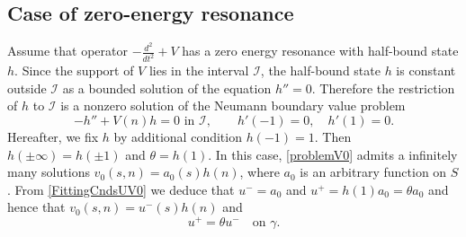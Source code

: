 \documentclass[reqno]{amsart}
\theoremstyle{plain}
\numberwithin{equation}{section}
\newcommand{\cI}{\mathcal{I}}
\begin{document}
\subsection{Case of zero-energy resonance}
Assume that operator $-\frac{d^2}{dt^2}+V$ has a zero energy resonance with half-bound state $h$. Since the support of $V$ lies in  the interval $\cI$, the half-bound state $h$ is  constant  outside $\cI$ as a bounded solution of the equation $h''=0$.
Therefore the restriction of $h$ to $\cI$ is a nonzero solution of the Neumann boundary value problem
\begin{equation}\label{NeumanProblem}
     -h''+V(n)h=0 \text{ \ in }\cI,\qquad   h'(-1)=0, \quad h'(1)=0.
\end{equation}
Hereafter, we fix $h$ by additional condition $h(-1)=1$. Then $h(\pm\infty)=h(\pm 1)$ and $\theta=h(1)$.
In this case, \eqref{problemV0}  admits a infinitely many solutions $v_0(s,n)=a_0(s)h(n)$, where $a_0$ is an arbitrary function on $S$.
From \eqref{FittingCndsUV0} we deduce that $u^-=a_0$ and $u^+=h(1) a_0=\theta a_0$ and hence that $v_0(s,n)=u^-(s)h(n)$ and
\begin{equation}\label{RCond0}
     u^+=\theta u^-\quad\text {on }\gamma.
\end{equation}
\end{document}
